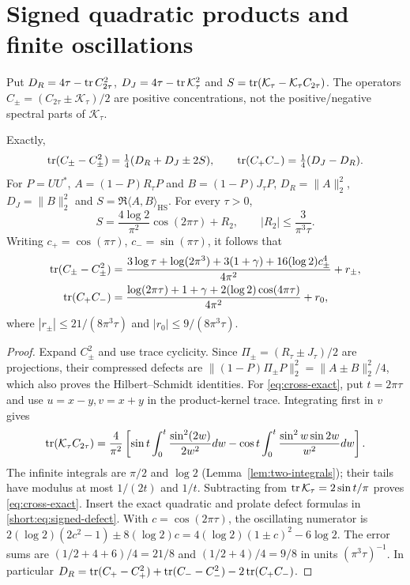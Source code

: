 \section{Signed quadratic products and finite oscillations}
Put $D_R=4\tau-\operatorname{tr} C_{2\tau}^2$,
$D_J=4\tau-\operatorname{tr}\mathcal K_\tau^2$ and
$S=\operatorname{tr}(\mathcal K_\tau-\mathcal K_\tau C_{2\tau})$.
The operators $C_\pm=(C_{2\tau}\pm\mathcal K_\tau)/2$ are positive
concentrations, not the positive/negative spectral parts of $\mathcal K_\tau$.

\begin{proposition}\label{prop:defect-identities}
\label{thm:cross-exact}\label{cor:signed-constants}
Exactly,
\begin{equation}\label{short:eq:signed-defect}
\operatorname{tr}(C_\pm-C_\pm^2)=\tfrac14(D_R+D_J\pm2S),\qquad
\operatorname{tr}(C_+C_-)=\tfrac14(D_J-D_R).
\end{equation}
For $P=UU^*$, $A=(1-P)R_\tau P$ and $B=(1-P)J_\tau P$,
$D_R=\|A\|_2^2$, $D_J=\|B\|_2^2$ and
$S=\Re\langle A,B\rangle_{\mathrm{HS}}$.
For every $\tau>0$,
\begin{equation}\label{eq:cross-exact}
S=\frac{4\log2}{\pi^2}\cos(2\pi\tau)+R_2,\qquad
|R_2|\le\frac3{\pi^3\tau}.
\end{equation}
Writing $c_+=\cos(\pi\tau)$, $c_-=\sin(\pi\tau)$, it follows that
\begin{align}
\operatorname{tr}(C_\pm-C_\pm^2)&=
\frac{3\log\tau+\log(2\pi^3)+3(1+\gamma)+16(\log2)c_\pm^4}{4\pi^2}
+r_\pm,
\label{eq:defect-plus}\\
\operatorname{tr}(C_+C_-)&=
\frac{\log(2\pi\tau)+1+\gamma+2(\log2)\cos(4\pi\tau)}{4\pi^2}
+r_0,
\label{eq:cross-product}
\end{align}
where $|r_\pm|\le21/(8\pi^3\tau)$ and $|r_0|\le9/(8\pi^3\tau)$.
\end{proposition}
\begin{proof}
Expand $C_\pm^2$ and use trace cyclicity. Since
$\Pi_\pm=(R_\tau\pm J_\tau)/2$ are projections, their compressed
defects are $\|(1-P)\Pi_\pm P\|_2^2=\|A\pm B\|_2^2/4$,
which also proves the Hilbert--Schmidt identities.
For \eqref{eq:cross-exact}, put $t=2\pi\tau$ and use $u=x-y,v=x+y$
in the product-kernel trace. Integrating first in $v$ gives
\[
\operatorname{tr}(\mathcal K_\tau C_{2\tau})=\frac4{\pi^2}
\left[\sin t\int_0^t\frac{\sin^2(2w)}{2w^2}dw
-\cos t\int_0^t\frac{\sin^2w\sin2w}{w^2}dw\right].
\]
The infinite integrals are $\pi/2$ and $\log2$
(Lemma~\ref{lem:two-integrals}); their tails have modulus at most
$1/(2t)$ and $1/t$. Subtracting from $\operatorname{tr}\mathcal K_\tau=2\sin t/\pi$
proves \eqref{eq:cross-exact}.
Insert the exact quadratic and prolate defect formulas in
\eqref{short:eq:signed-defect}.
With $c=\cos(2\pi\tau)$, the oscillating numerator is
$2(\log2)(2c^2-1)\pm8(\log2)c
=4(\log2)(1\pm c)^2-6\log2$.
The error sums are $(1/2+4+6)/4=21/8$ and $(1/2+4)/4=9/8$
in units $(\pi^3\tau)^{-1}$.
In particular
$D_R=\operatorname{tr}(C_+-C_+^2)+\operatorname{tr}(C_--C_-^2)-2\operatorname{tr}(C_+C_-)$.
\end{proof}

